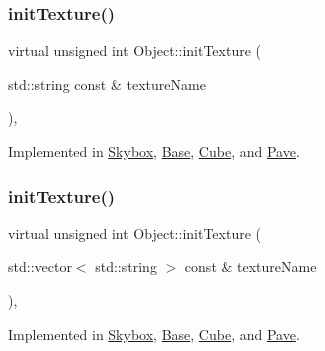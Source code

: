 \subsubsection{\texorpdfstring{init\+Texture()}{initTexture()}\hspace{0.1cm}{\footnotesize\ttfamily [1/2]}}
{\footnotesize\ttfamily virtual unsigned int Object\+::init\+Texture (\begin{DoxyParamCaption}\item[{std\+::string const \&}]{texture\+Name }\end{DoxyParamCaption})\hspace{0.3cm}{\ttfamily [protected]}, {}}



Implemented in \hyperlink{classSkybox_a0184f32862c7c46efcce78bde9ee9836}{Skybox}, \hyperlink{classBase_ae1e3b63d1e2d374e1dc49a9160717cfe}{Base}, \hyperlink{classCube_ad4e00146ffacc5d272aa0c501bee4dca}{Cube}, and \hyperlink{classPave_ae3deef5b3908954e34944051f00fea39}{Pave}.

\mbox{\label{classObject_ac18935ff7831cb35dc462b581d2ccf3c}} 
\subsubsection{\texorpdfstring{init\+Texture()}{initTexture()}\hspace{0.1cm}{\footnotesize\ttfamily [2/2]}}
{\footnotesize\ttfamily virtual unsigned int Object\+::init\+Texture (\begin{DoxyParamCaption}\item[{std\+::vector$<$ std\+::string $>$ const \&}]{texture\+Name }\end{DoxyParamCaption})\hspace{0.3cm}{\ttfamily [protected]}, {}}



Implemented in \hyperlink{classSkybox_ae290e8e7374b983c153b581500cd11f3}{Skybox}, \hyperlink{classBase_ae8bcd2edd2c191d58109502792a067ab}{Base}, \hyperlink{classCube_a9ffa60b8c97c5419277b0ad2f9a3e92e}{Cube}, and \hyperlink{classPave_a00f96f2cd410ebc8d95ebc482f79f966}{Pave}.

\mbox{\label{classObject_a262654508b0a6a8cd277911161c71024}} 
